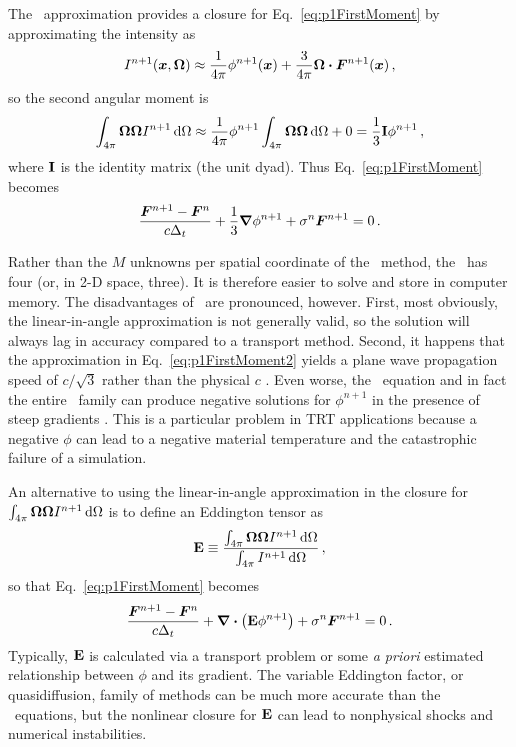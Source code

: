 The \Pone\ approximation provides a closure for Eq.~\eqref{eq:p1FirstMoment} by
approximating the intensity as
\begin{equation}\label{eq:p1Approx}
  I^{n+1}(\bm{x},\bm{\Omega})
  \approx \frac{1}{4\pi} \phi^{n+1}(\bm{x})
  + \frac{3}{4\pi} \bm{\Omega}\bm{\cdot} \bm{F}^{n+1}(\bm{x}) \,,
\end{equation}
so the second angular moment is
\begin{equation*}
  \int_{4\pi} \bm{\Omega}\bm{\Omega} I^{n+1} \mathop{}\!\mathrm{d}\Omega
  \approx \frac{1}{4\pi} \phi^{n+1}
  \int_{4\pi} \bm{\Omega}\bm{\Omega}\mathop{}\!\mathrm{d}\Omega + 0
  = \frac{1}{3} \mathbf{I} \phi^{n+1}\,,
\end{equation*}
where $\mathbf{I}$ is the identity matrix (the unit dyad). Thus
Eq.~\eqref{eq:p1FirstMoment} becomes
\begin{equation} \label{eq:p1FirstMoment2}
  \frac{\bm{F}^{n+1} - \bm{F}^n }{c \Delta_t} + \frac{1}{3} \bm{\nabla} \phi^{n+1}
  + \sigma^n \bm{F}^{n+1}
  = 0\,.
\end{equation}

Rather than the $M$ unknowns per spatial coordinate of the \SN\ method, the
\Pone\ has four (or, in 2-D space, three). It is therefore easier to solve and
store in computer memory. The disadvantages of \Pone\ are pronounced, however.
First, most obviously, the linear-in-angle approximation is not generally valid, so
the solution will
always lag in accuracy compared to a transport method. Second, it happens that
the approximation in Eq.~\eqref{eq:p1FirstMoment2} yields a plane wave
propagation speed of $c/\sqrt{3}$ rather than the physical $c$
\cite{Mih1984,War2002}. Even worse, the \Pone\ equation and in fact the entire
\PN\ family can produce negative solutions for $\phi^{n+1}$ in the presence of
steep gradients \cite{Bru2002,McC2007}. This is a particular problem in TRT
applications because a negative $\phi$ can lead to a negative material temperature and
the catastrophic failure of a simulation.

An alternative to using the linear-in-angle approximation in the closure for
$\int_{4\pi} \bm{\Omega}\bm{\Omega} I^{n+1} \mathop{}\!\mathrm{d}\Omega$ is to define an
Eddington tensor \cite{Pom1982,Ols2000} as
\begin{equation*}
  \mathbf{E} \equiv \frac{\int_{4\pi} \bm{\Omega}\bm{\Omega} I^{n+1}
  \mathop{}\!\mathrm{d}\Omega}{\int_{4\pi} I^{n+1} \mathop{}\!\mathrm{d}\Omega}\,,
\end{equation*}
so that Eq.~\eqref{eq:p1FirstMoment} becomes
\begin{equation*}
  \frac{\bm{F}^{n+1} - \bm{F}^n }{c \Delta_t}
  + \bm{\nabla} \bm{\cdot} \left( \mathbf{E}\phi^{n+1} \right)
  + \sigma^n \bm{F}^{n+1}
  = 0\,.
\end{equation*}
Typically, $\mathbf{E}$ is calculated via a transport problem or some \emph{a
priori} estimated relationship between $\phi$ and its gradient.
The variable Eddington factor, or quasidiffusion, family of methods can be much
more accurate than the \Pone\ equations, but the nonlinear closure for $\mathbf{E}$
can lead to nonphysical shocks and numerical instabilities.

